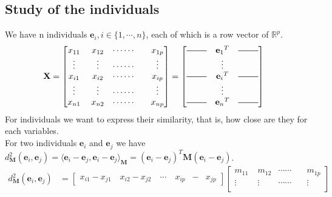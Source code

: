 \begin{notechapter}
\section{Study of the individuals}
We have n individuals $\mathbf{e}_{i}, i \in \{1,\cdots,n\}$, each of which is a row vector of $\mathbb{R}^{p}$.\\
\begin{align*}
    \textbf{X} &=
    \begin{bmatrix*}
        x_{{1}{1}}& \; x_{{1}{2}}&  \cdots \cdots  \quad &x_{{1}{p}}\\
        \vdots& \; \vdots& \cdots \cdots  \quad &\vdots \\
        x_{{i}{1}}& \; x_{{i}{2}}&  \cdots \cdots  \quad &x_{{i}{p}}\\
        \vdots& \; \vdots& \cdots \cdots  \quad &\vdots \\
        x_{{n}{1}}& \; x_{{n}{2}}&  \cdots \cdots  \quad &x_{{n}{p}}
    \end{bmatrix*}
    =
    \begin{bmatrix*}
        \horzbar &{\mathbf{e}_{1}}^T& \horzbar\\
        &\vdots&\\
        \horzbar &{\mathbf{e}_{i}}^T& \horzbar\\
        &\vdots&\\
        \horzbar &{\mathbf{e}_{n}}^T& \horzbar
    \end{bmatrix*}
\end{align*}
For individuals we want to express their similarity, that is, how close are they for each variables.
\\[5pt]
For two individuals $\mathbf{e}_{i}$ and $\mathbf{e}_{j}$ we have
$d_{\textbf{M}}^2(\mathbf{e}_{i}, \mathbf{e}_{j}) = 
\langle \mathbf{e}_{i} - \mathbf{e}_{j}, \mathbf{e}_{i} - \mathbf{e}_{j} \rangle_{\textbf{M}} = 
(\mathbf{e}_{i} - \mathbf{e}_{j})^{T}\textbf{M}(\mathbf{e}_{i} - \mathbf{e}_{j})$.
\\[10pt]
\begin{align*}
d_{\textbf{M}}^2(\mathbf{e}_{i}, \mathbf{e}_{j}) &= 
\begin{bmatrix*}
    x_{{i}{1}} - x_{{j}{1}} \quad x_{{i}{2}} - x_{{j}{2}} \quad  \cdots  \quad x_{{i}{p}} & - &x_{{j}{p}}
\end{bmatrix*}
\begin{bmatrix*}
    m_{{1}{1}}& \; m_{{1}{2}}&  \cdots \cdots  \quad &m_{{1}{p}}\\
    \vdots& \; \vdots& \cdots \cdots  \quad &\vdots \\

\end{bmatrix*}
\end{align*}
\end{notechapter}
